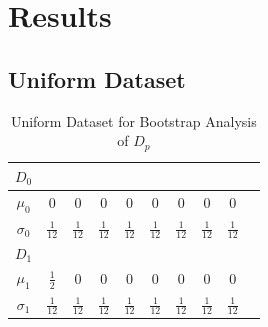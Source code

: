\documentclass{article}
\begin{document}
	\section{Results}
	
	
	\subsection*{\small Uniform Dataset}
	
	\begin{table}[ht]
		\caption{Uniform Dataset for Bootstrap Analysis of $D_p$}
		\centering %
		\begin{tabular}{c c c c c c c c c c} %
			$D_0$ &  &  &  \\ [0.5ex] %
			\hline %
			$\mu_0$ & 0 & 0 & 0 & 0 & 0 & 0 & 0 & 0\\[0.5ex] %
			$\sigma_0$ & \( \frac{1}{12} \) & \( \frac{1}{12} \) & \( \frac{1}{12} \) & \( \frac{1}{12} \) & \( \frac{1}{12} \) & \( \frac{1}{12} \) & \( \frac{1}{12} \) & \( \frac{1}{12} \) &  \\[2ex]
			
			$D_1$ & \\ [0.5ex]
			
			\hline
			$\mu_1$ & \( \frac{1}{2} \) & 0 & 0 & 0 & 0 & 0 & 0 & 0\\[0.5ex] %
			$\sigma_1$ & \( \frac{1}{12} \) & \( \frac{1}{12} \) & \( \frac{1}{12} \) & \( \frac{1}{12} \) & \( \frac{1}{12} \) & \( \frac{1}{12} \) & \( \frac{1}{12} \) & \( \frac{1}{12} \) &  \\ [1ex] %
			\hline %
		\end{tabular}
		\label{table:nonlin} %
	\end{table}
	
\end{document}

